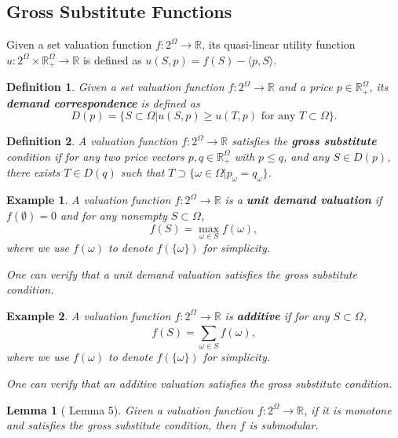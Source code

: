 \documentclass[openany]{book}
\newtheorem{definition}{Definition}[chapter]
\newtheorem{lemma}{Lemma}[chapter]
\newtheorem{example}{Example}[chapter]
\theoremstyle{remark}
\begin{document}
\subsection{Gross Substitute Functions}
Given a set valuation function $f:2^{\Omega}\to \mathbb{R}$, its quasi-linear utility function $u:2^{\Omega}\times \mathbb{R}_+^{\Omega}\to \mathbb{R}$ is defined as $u(S,p)=f(S)-\langle p,S\rangle$.
\begin{definition}
    Given a set valuation function $f:2^{\Omega}\to \mathbb{R}$ and a price $p\in \mathbb{R}_+^{\Omega}$, its \textbf{demand correspondence} is defined as
    \begin{equation}
        D(p)=\{S\subset \Omega|u(S,p)\ge u(T,p)\textrm{ for any }T\subset\Omega\}.
    \end{equation}
\end{definition}
\begin{definition}
    A valuation function $f:2^{\Omega}\to \mathbb{R}$ satisfies the \textbf{gross substitute} condition if for any two price vectors $p,q\in \mathbb{R}_+^{\Omega}$ with $p\le q$, and any $S\in D(p)$, there exists $T\in D(q)$ such that $T\supset\{\omega\in\Omega|p_{\omega}=q_{\omega}\}$.
\end{definition}
\begin{example}
    A valuation function $f:2^{\Omega}\to \mathbb{R}$ is a \textbf{unit demand valuation} if $f(\emptyset)=0$ and for any nonempty $S\subset\Omega$,
    \begin{equation}
        f(S)=\max_{\omega\in S}f(\omega),
    \end{equation}
    where we use $f(\omega)$ to denote $f(\{\omega\})$ for simplicity.

    One can verify that a unit demand valuation satisfies the gross substitute condition.
\end{example}
\begin{example}
    A valuation function $f:2^{\Omega}\to \mathbb{R}$ is \textbf{additive} if for any $S\subset\Omega$,
    \begin{equation}
        f(S)=\sum_{\omega\in S}^{}f(\omega),
    \end{equation}
    where we use $f(\omega)$ to denote $f(\{\omega\})$ for simplicity.

    One can verify that an additive valuation satisfies the gross substitute condition.
\end{example}
\begin{lemma}[\cite{GS99} Lemma 5]
    Given a valuation function $f:2^{\Omega}\to \mathbb{R}$, if it is monotone and satisfies the gross substitute condition, then $f$ is submodular.
\end{lemma}



\end{document}
